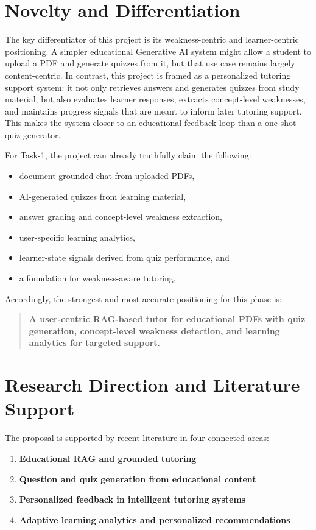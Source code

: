 \documentclass[11pt,a4paper]{article}
\begin{document}
\section{Novelty and Differentiation}
The key differentiator of this project is its weakness-centric and learner-centric positioning. A simpler educational Generative AI system might allow a student to upload a PDF and generate quizzes from it, but that use case remains largely content-centric. In contrast, this project is framed as a personalized tutoring support system: it not only retrieves answers and generates quizzes from study material, but also evaluates learner responses, extracts concept-level weaknesses, and maintains progress signals that are meant to inform later tutoring support. This makes the system closer to an educational feedback loop than a one-shot quiz generator.

For Task-1, the project can already truthfully claim the following:

\begin{itemize}
    \item document-grounded chat from uploaded PDFs,
    \item AI-generated quizzes from learning material,
    \item answer grading and concept-level weakness extraction,
    \item user-specific learning analytics,
    \item learner-state signals derived from quiz performance, and
    \item a foundation for weakness-aware tutoring.
\end{itemize}

Accordingly, the strongest and most accurate positioning for this phase is:

\begin{quote}
\textbf{A user-centric RAG-based tutor for educational PDFs with quiz generation, concept-level weakness detection, and learning analytics for targeted support.}
\end{quote}

\section{Research Direction and Literature Support}
The proposal is supported by recent literature in four connected areas:

\begin{enumerate}
    \item \textbf{Educational RAG and grounded tutoring} \cite{nye2023dialog,levonian2023ragmath,han2024tutoringrag,swacha2025survey}
    \item \textbf{Question and quiz generation from educational content} \cite{bhowmick2023qg,kurulkar2025quizrag}
    \item \textbf{Personalized feedback in intelligent tutoring systems} \cite{reddig2025feedback,levonian2025safechat}
    \item \textbf{Adaptive learning analytics and personalized recommendations} \cite{li2025tutorllm,naseer2025adaptive}
\end{enumerate}
\end{document}

